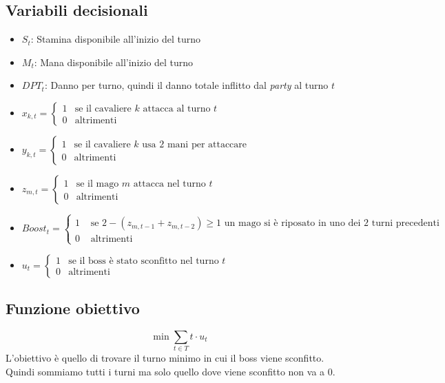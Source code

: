 \documentclass[12pt]{article}
\begin{document}
   \subsection{Variabili decisionali}
   \begin{itemize}
    \item $S_t$: Stamina disponibile all'inizio del turno
    \item $M_t$: Mana disponibile all'inizio del turno
    \item $DPT_t$: Danno per turno, quindi il danno totale inflitto dal \textit{party} al turno $t$
    \item $x_{k,t} = \begin{cases} 
        1 & \text{se il cavaliere } k \text{ attacca al turno } t \\ 
        0 & \text{altrimenti} 
    \end{cases}$
    \item $y_{k,t} = \begin{cases} 
        1 & \text{se il cavaliere } k \text{ usa 2 mani per attaccare } \\ 
        0 & \text{altrimenti} 
    \end{cases}$
    \item $z_{m,t} = \begin{cases} 
        1 & \text{se il mago } m \text{ attacca nel turno } t \\ 
        0 & \text{altrimenti} 
    \end{cases}$
    \item $Boost_t = \begin{cases}
        1 & \text{ se } 2- (z_{m,t-1} + z_{m,t-2}) \geq 1 \text{ un mago si è riposato in uno dei 2 turni precedenti } \\
        0 & \text{ altrimenti }
    \end{cases}$
    \item $u_t = \begin{cases}
        1 & \text{se il boss è stato sconfitto nel turno } t \\
        0 & \text{altrimenti}
    \end{cases}$
    \end{itemize}
   \subsection{Funzione obiettivo}
    \begin{equation}
        \min \sum_{t \in T} t \cdot u_t
    \end{equation}
    L'obiettivo è quello di trovare il turno minimo in cui il boss viene sconfitto. Quindi sommiamo tutti i turni ma solo quello dove viene sconfitto non va a 0.\\
\end{document}
